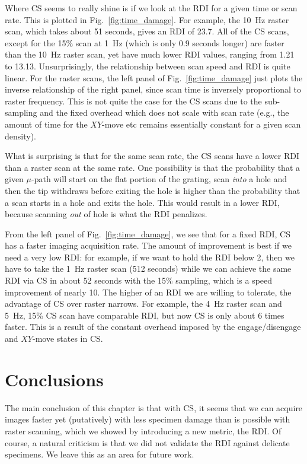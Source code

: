 Where CS seems to really shine is if we look at the RDI for a given time or scan rate. This is plotted in Fig.~\ref{fig:time_damage}. For example, the 10~Hz raster scan, which takes about 51 seconds, gives an RDI of 23.7. All of the CS scans, except for the 15\% scan at 1~Hz (which is only 0.9 seconds longer) are faster than the 10~Hz raster scan, yet have much lower RDI values, ranging from 1.21 to 13.13.
Unsurprisingly, the relationship between scan speed and RDI is quite linear. For the raster scans, the left panel of Fig.~\ref{fig:time_damage} just plots the inverse relationship of the right panel, since scan time is inversely proportional to raster frequency. This is not quite the case for the CS scans due to the sub-sampling and the fixed overhead which does not scale with scan rate (e.g., the amount of time for the $XY$-move etc remains essentially constant for a given scan density).

What is surprising is that for the same scan rate, the CS scans have a lower RDI than a raster scan at the same rate. One possibility is that the probability that a given $\mu$-path will start on the flat portion of the grating, scan \textit{into} a hole and then the tip withdraws before exiting the hole is higher than the probability that a scan starts in a hole and exits the hole. This would result in a lower RDI, because scanning \textit{out} of hole is what the RDI penalizes.

From the left panel of Fig.~\ref{fig:time_damage}, we see that for a fixed RDI, CS has a faster imaging acquisition rate. The amount of improvement is best if we need a very low RDI: for example, if we want to hold the RDI below 2, then we have to take the 1~Hz raster scan (512 seconds) while we can achieve the same RDI via CS in about 52 seconds with the 15\% sampling, which is a speed improvement of nearly 10. The higher of an RDI we are willing to tolerate, the advantage of CS over raster narrows. For example, the 4~Hz raster scan and 5~Hz, 15\% CS scan have comparable RDI, but now CS is only about 6 times faster. This is a result of the constant overhead imposed by the engage/disengage and $XY$-move states in CS.

\section{Conclusions}
The main conclusion of this chapter is that with CS, it seems that we can acquire images faster yet (putatively) with less specimen damage than is possible with raster scanning, which we showed by introducing a new metric, the RDI. Of course, a natural criticism is that we did not validate the RDI against delicate specimens. We leave this as an area for future work.

